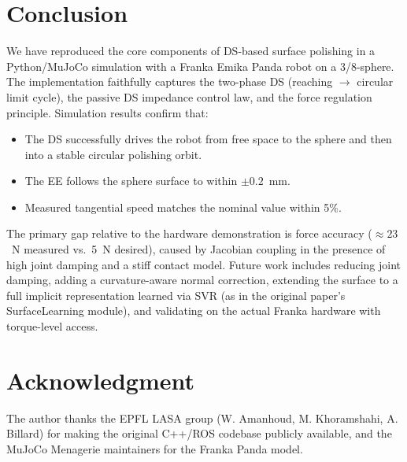 \documentclass[conference]{IEEEtran}
\begin{document}
\section{Conclusion}
\label{sec:conclusion}

We have reproduced the core components of DS-based surface polishing in a
Python/MuJoCo simulation with a Franka Emika Panda robot on a 3/8-sphere.
The implementation faithfully captures the two-phase DS (reaching $\to$
circular limit cycle), the passive DS impedance control law, and the force
regulation principle. Simulation results confirm that:
\begin{itemize}
  \item The DS successfully drives the robot from free space to the sphere
        and then into a stable circular polishing orbit.
  \item The EE follows the sphere surface to within $\pm 0.2$~mm.
  \item Measured tangential speed matches the nominal value within 5\%.
\end{itemize}

The primary gap relative to the hardware demonstration is force accuracy
($\approx 23$~N measured vs.\ 5~N desired), caused by Jacobian coupling in
the presence of high joint damping and a stiff contact model. Future work
includes reducing joint damping, adding a curvature-aware normal correction,
extending the surface to a full implicit representation learned via SVR
(as in the original paper's SurfaceLearning module), and validating on the
actual Franka hardware with torque-level access.

\section*{Acknowledgment}
The author thanks the EPFL LASA group (W. Amanhoud, M. Khoramshahi, A. Billard)
for making the original C++/ROS codebase publicly available, and the
MuJoCo Menagerie maintainers for the Franka Panda model.
\end{document}
